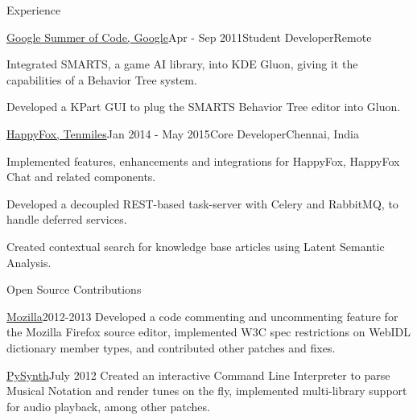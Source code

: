 \documentclass{resume} %
\begin{document}
\begin{rSection}{Experience}

    \begin{rSubsection}{\href{https://www.google-melange.com/gsoc/project/details/google/gsoc2011/pranavrc/5757334940811264}{Google Summer of Code, Google}}{Apr - Sep 2011}{Student Developer}{Remote}
\item Integrated SMARTS, a game AI library, into KDE Gluon, giving it the capabilities of a Behavior Tree system.
\item Developed a KPart GUI to plug the SMARTS Behavior Tree editor into Gluon.
\end{rSubsection}


\begin{rSubsection}{\href{https://happyfox.com/}{HappyFox, Tenmiles}}{Jan 2014 - May 2015}{Core Developer}{Chennai, India}
\item Implemented features, enhancements and integrations for HappyFox, HappyFox Chat and related components.
\item Developed a decoupled REST-based task-server with Celery and RabbitMQ, to handle deferred services.
\item Created contextual search for knowledge base articles using Latent Semantic Analysis.
\end{rSubsection}


\end{rSection}


\begin{rSection}{Open Source Contributions}

\begin{rSubsection}{\href{https://bugzilla.mozilla.org/user\%5Fprofile?user\%5Fid=431664}{Mozilla}}{2012-2013}{}{}
Developed a code commenting and uncommenting feature for the Mozilla Firefox source editor, implemented W3C spec restrictions on WebIDL dictionary member types, and contributed other patches and fixes.
\end{rSubsection}

\begin{rSubsection}{\href{https://github.com/mdoege/PySynth/commits?author=pranavrc}{PySynth}}{July 2012}{}{}
Created an interactive Command Line Interpreter to parse Musical Notation and render tunes on the fly, implemented multi-library support for audio playback, among other patches.
\end{rSubsection}

\end{rSection}
\end{document}
